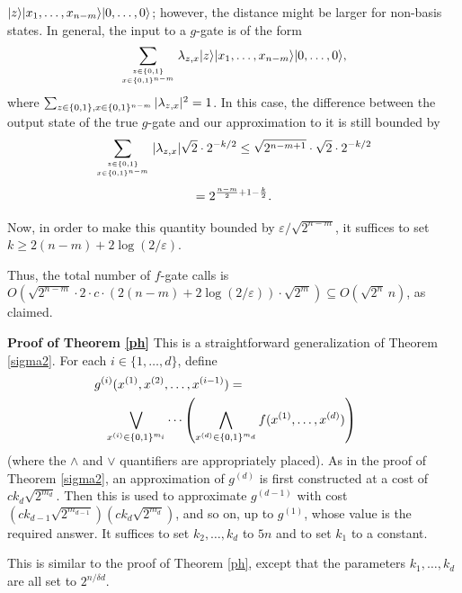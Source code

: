 $\mbox{$| z \rangle$}\mbox{$| x_1,\ldots,x_{n-m} \rangle$}\mbox{$| 0,\ldots,0 \rangle$}$; however, the distance 
might be larger for non-basis states.
In general, the input to a $g$-gate is of the form 
\begin{equation}
\sum_{z \in \01 \atop x \in \01^{n-m}} 
\lambda_{z,x} \ket{z}\ket{x_1,\ldots,x_{n-m}}\ket{0,\ldots,0}, 
\end{equation}
where $\sum_{z \in \01, x \in \01^{n-m}} |\lambda_{z,x}|^2 = 1$.
In this case, the difference between the output state of the true 
$g$-gate and our approximation to it is still bounded by 
\[
\sum_{z \in \01 \atop x \in \01^{n-m}} |\lambda_{z,x}| \sqrt{2} \cdot 2^{-k/2} 
\le \sqrt{2^{n-m+1}} \cdot \sqrt{2} \cdot 2^{-k/2}\]
\begin{equation}
 = 2^{{n-m \over 2} + 1 - {k \over 2}}.
\end{equation}

Now, in order to make this quantity bounded by $\varepsilon / \sqrt{2^{n-m}}$, 
it suffices to set $k \ge 2(n-m) + 2 \log(2/\varepsilon)$.

Thus, the total number of $f$-gate calls is 
$O(\sqrt{2^{n-m}} \cdot 2 \cdot c \cdot (2(n-m) + 2 \log(2/\varepsilon)) 
\cdot \sqrt{2^m}) \subseteq O(\sqrt{2^n}\,n)$, as claimed.\ee

\noindent
{\bf Proof of Theorem \ref{ph}}
This is a straightforward generalization of Theorem \ref{sigma2}.
For each $i \in \{1,\ldots,d\}$, define 
\begin{eqnarray}
\lefteqn{g^{(i)}(x^{(1)},x^{(2)},\ldots,x^{(i-1)}) =} & & \nonumber \\
& & \bigvee_{x^{(i)} \in \01^{m_i}}
\cdots \left(\bigwedge_{x^{(d)} \in \01^{m_d}} f(x^{(1)},\ldots,x^{(d)})
\right) \ \ \ \ 
\end{eqnarray}
(where the $\wedge$ and $\vee$ quantifiers are appropriately placed).
As in the proof of Theorem \ref{sigma2}, an approximation of 
$g^{(d)}$ is first constructed at a cost of $c k_d \sqrt{2^{m_d}}$.
Then this is used to approximate $g^{(d-1)}$ with cost 
$(c k_{d-1} \sqrt{2^{m_{d-1}}})(c k_d \sqrt{2^{m_d}})$, and so on, 
up to $g^{(1)}$, whose value is the required answer.
It suffices to set $k_2,\ldots,k_{d}$ to $5n$ and to set $k_1$ to 
a constant.\ee


This is similar to the proof of Theorem \ref{ph}, except that 
the parameters $k_1,\ldots,k_d$ are all set to $2^{n / \delta d}$.\ee


